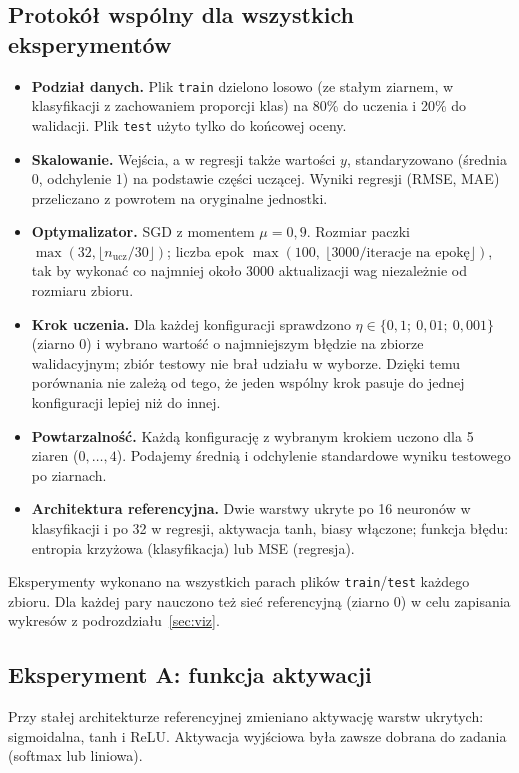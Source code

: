 \documentclass[11pt,a4paper]{article}
\begin{document}
	\subsection{Protokół wspólny dla wszystkich eksperymentów}
	\begin{itemize}
		\item \textbf{Podział danych.} Plik \texttt{train} dzielono losowo (ze stałym ziarnem, w klasyfikacji z zachowaniem proporcji klas) na 80\% do uczenia i 20\% do walidacji. Plik \texttt{test} użyto tylko do końcowej oceny.
		\item \textbf{Skalowanie.} Wejścia, a w regresji także wartości $y$, standaryzowano (średnia $0$, odchylenie $1$) na podstawie części uczącej. Wyniki regresji (RMSE, MAE) przeliczano z powrotem na oryginalne jednostki.
		\item \textbf{Optymalizator.} SGD z momentem $\mu=0{,}9$. Rozmiar paczki $\max(32,\lfloor n_{\mathrm{ucz}}/30\rfloor)$; liczba epok $\max(100,\ \lfloor 3000/\text{iteracje na epokę}\rfloor)$, tak by wykonać co najmniej około 3000 aktualizacji wag niezależnie od rozmiaru zbioru.
		\item \textbf{Krok uczenia.} Dla każdej konfiguracji sprawdzono $\eta\in\{0{,}1;\ 0{,}01;\ 0{,}001\}$ (ziarno 0) i wybrano wartość o najmniejszym błędzie na zbiorze walidacyjnym; zbiór testowy nie brał udziału w wyborze. Dzięki temu porównania nie zależą od tego, że jeden wspólny krok pasuje do jednej konfiguracji lepiej niż do innej.
		\item \textbf{Powtarzalność.} Każdą konfigurację z wybranym krokiem uczono dla 5 ziaren ($0,\dots,4$). Podajemy średnią i odchylenie standardowe wyniku testowego po ziarnach.
		\item \textbf{Architektura referencyjna.} Dwie warstwy ukryte po 16 neuronów w klasyfikacji i po 32 w regresji, aktywacja tanh, biasy włączone; funkcja błędu: entropia krzyżowa (klasyfikacja) lub MSE (regresja).
	\end{itemize}
	Eksperymenty wykonano na wszystkich parach plików \texttt{train}/\texttt{test} każdego zbioru. Dla każdej pary nauczono też sieć referencyjną (ziarno 0) w celu zapisania wykresów z podrozdziału~\ref{sec:viz}.
	
	\subsection{Eksperyment A: funkcja aktywacji}
	Przy stałej architekturze referencyjnej zmieniano aktywację warstw ukrytych: sigmoidalna, tanh i ReLU. Aktywacja wyjściowa była zawsze dobrana do zadania (softmax lub liniowa).
	
\end{document}
